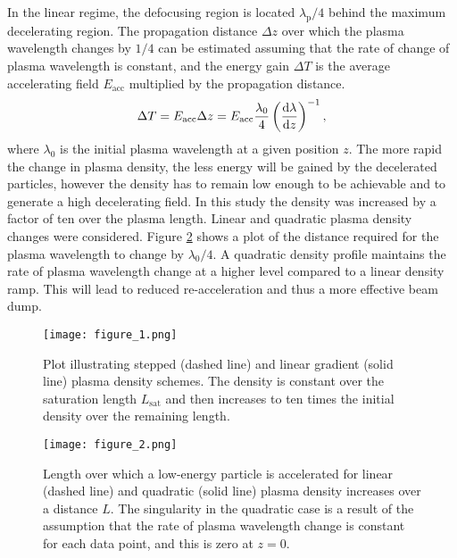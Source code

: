 \documentclass[aip,pop,preprint,superscriptaddress]{revtex4-1}
\begin{document}
In the linear regime, the defocusing region is located $\lambda_{\mathrm{p}} /4$ behind the maximum decelerating region. The propagation distance $\Delta z$ over which the plasma wavelength changes by $1/4$ can be estimated assuming that the rate of change of plasma wavelength is constant, and the energy gain $\Delta T$ is the average accelerating field $E_{\mathrm{acc}}$ multiplied by the propagation distance.
\begin{equation}
  \label{delta_x}
  \Delta T = E_{\mathrm{acc}} \Delta z = E_{\mathrm{acc}} {{\lambda_0}\over 4}\left({{{\mathrm{d}\lambda}} \over {\mathrm{d}z}}\right)^{-1},
\end{equation}
where $\lambda_0$ is the initial plasma wavelength at a given position $z$. The  more rapid the change in plasma density, the less energy will be gained by the decelerated particles, however the density has to remain low enough to be achievable and to generate a high decelerating field. In this study the density was increased by a factor of ten over the plasma length. Linear and quadratic plasma density changes were considered. Figure \ref{gradient_energy_gain} shows a plot of the distance required for the plasma wavelength to change by ${{\lambda_0}/4}$. A quadratic density profile maintains the rate of plasma wavelength change at a higher level compared to a linear density ramp. This will lead to reduced re-acceleration and thus a more effective beam dump.

\begin{figure}[htb]
  \centering
  \texttt{[image: figure\_1.png]}
  \caption{Plot illustrating stepped (dashed line) and linear gradient (solid line) plasma density schemes. The density is constant over the saturation length $L_{\mathrm{sat}}$ and then increases to ten times the initial density over the remaining length.}
  \label{density_diagrams}
\end{figure}

\begin{figure}[htb]
  \centering
  \texttt{[image: figure\_2.png]}
  \caption{Length over which a low-energy particle is accelerated for linear (dashed line) and quadratic (solid line) plasma density increases over a distance $L$. The singularity in the quadratic case is a result of the assumption that the rate of plasma wavelength change is constant for each data point, and this is zero at $z=0$.}
  \label{gradient_energy_gain}
\end{figure}
\end{document}
